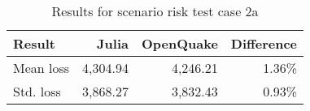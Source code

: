 \begin{table}[h]

\centering
\begin{tabular}{ l r r r }

\hline
\rowcolor{anti-flashwhite}
\bf{Result} & \bf{Julia} & \bf{OpenQuake} & \bf{Difference}\\
\hline
Mean loss & 4,304.94 & 4,246.21 & 1.36\% \\
Std. loss & 3,868.27 & 3,832.43 & 0.93\% \\
\hline
\end{tabular}

\caption{Results for scenario risk test case 2a}
\label{tab:result-sr-2a}
\end{table}
